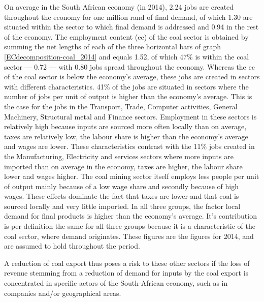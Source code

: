 \documentclass[12pt,english]{article}
\begin{document}
On average in the South African economy (in 2014), 2.24 jobs are created throughout the economy for one million rand of final demand, of which 1.30 are situated within the sector to which final demand is addressed and 0.94 in the rest of the economy. The employment content (ec) of the coal sector is obtained by summing the net lengths of each of the three horizontal bars of graph \ref{ECdecomposition-coal_2014} and equals 1.52, of which 47\% is within the coal sector --- 0.72 --- with 0.80 jobs spread throughout the economy. Whereas the ec of the coal sector is below the economy's average, these jobs are created in sectors with different characteristics. 41\% of the jobs are situated in sectors where the number of jobs per unit of output is higher than the economy's average. This is the case for the jobs in the Transport, Trade, Computer activities, General Machinery, Structural metal and Finance sectors. Employment in these sectors is relatively high because inputs are sourced more often locally than on average, taxes are relatively low, the labour share is higher than the economy's average and wages are lower. These characteristics contrast with the 11\% jobs created in the Manufacturing, Electricity and services sectors where more inputs are imported than on average in the economy, taxes are higher, the labour share lower and wages higher. The coal mining sector itself employs less people per unit of output mainly because of a low wage share and secondly because of high wages. These effects dominate the fact that taxes are lower and that coal is sourced locally and very little imported. In all three groups, the factor local demand for final products is higher than the economy's average. It's contribution is per definition the same for all three groups because it is a characteristic of the coal sector, where demand originates. These figures  are the figures for 2014, and are assumed to hold throughout the period. 


A reduction of coal export thus poses a risk to these other sectors if the loss of revenue stemming from a reduction of demand for inputs by the coal export is concentrated in specific actors of the South-African economy, such as in companies and/or geographical areas.


\end{document}
